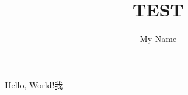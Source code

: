 \documentclass[UTF8]{ctexart}
\author{My Name}
\title{TEST}
\begin{document}
    \maketitle
    Hello, World!我
\end{document}
